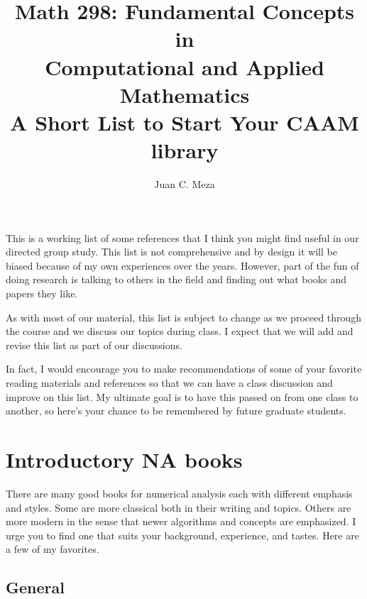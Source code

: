 \documentclass[11pt]{article}
\title{Math 298: Fundamental Concepts in \\ Computational and Applied Mathematics\\ {\normalsize A Short List to Start Your CAAM library}}
\author{Juan C. Meza}
\begin{document}
\maketitle

This is a working list of some references that I think you might find useful in our directed group study.   This list is not comprehensive and by design it will be biased because of my own experiences over the years.  However, part of the fun of doing research is talking to others in the field and finding out what books and papers they like.

As with most of our material, this list is subject to change as we proceed through the course and we discuss our topics during class.  I expect that we will add and revise this list as part of our discussions.  

In fact, I would encourage you to make recommendations of some of your favorite reading materials and references so that we can have a class discussion and improve on this list.  My ultimate goal is to have this passed on from one class to another, so here's your chance to be remembered by future graduate students.

\section{Introductory NA books}

There are many good books for numerical analysis each with different emphasis and styles.   Some are more classical both in their writing and topics.  Others are more modern in the sense that newer algorithms and concepts are emphasized.  I urge you to find one that suits your background, experience, and tastes.  Here are a few of my favorites.

\subsection{General}
\end{document}
